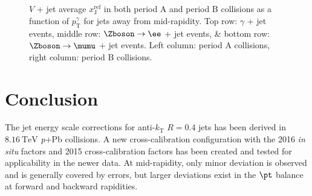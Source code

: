 \documentclass[NOTE, atlasdraft=true, texlive=2016, USenglish]{\ATLASLATEXPATH atlasdoc}
\begin{document}
\begin{figure}[htbp]
	\centering
	 \\
	 \\
	\caption{$V$ + jet average $x_{\text{J}}^{\text{ref}}$ in both period A and period B collisions as a function of $p_{\text{T}}^{\gamma}$ for jets away from mid-rapidity. Top row: $\gamma$ + jet events, middle row: $\Zboson\rightarrow\ee$ + jet events, \& bottom row: $\Zboson\rightarrow\mumu$ + jet events. Left column: period A collisions, right column: period B collisions.}
	\label{fig:xjref_pT_forward}
\end{figure}

\section{Conclusion}
\label{sec:conclusion}

The jet energy scale corrections for anti-$k_{\text{T}}$ $R=0.4$ jets has been derived in $\SI{8.16}{\TeV}$ \textit{p}+Pb collisions. A new cross-calibration configuration with the 2016 \textit{in situ} factors and 2015 cross-calibration factors has been created and tested for applicability in the newer data. At mid-rapidity, only minor deviation is observed and is generally covered by errors, but larger deviations exist in the $\pt$ balance at forward and backward rapidities.  


\clearpage
\printbibliography
% 
% 
\end{document}
